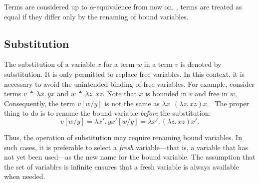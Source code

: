 \begin{convention}
  Terms are considered up to $\alpha$-equivalence from now on, \ie,  terms are treated as equal if they differ only by the renaming of bound variables.
\end{convention}

\subsection{Substitution}



The substitution of a variable $x$ for a term $w$ in a term $v$ is denoted by \gls{substitution}. It is only permitted to replace free variables. In this context, it is necessary to avoid the unintended binding of free variables. For example, consider terms $ v \triangleq \lambda x. \, yx$ and $ w \triangleq \lambda z. \, xz$. Note that $x$ is bounded in $v$ and free in $w$, Consequently, the term $v[w/y]$ is not the same as $  \lambda x. \,  (\lambda z. \, xz) x$.  The proper thing to do is to rename the bound variable \emph{before} the substitution:
\[v[w/y] = \lambda x'. \, yx' [w/y]=  \lambda x'. \,  (\lambda z. \, xz) x'. \]

Thus, the operation of substitution may require renaming bound variables. 
In such cases, it is preferable to select a \emph{fresh} variable---that is, 
a variable that has not yet been used---as the new name for the bound variable. 
The assumption that the set of variables is infinite ensures that a fresh variable is always available when needed.

